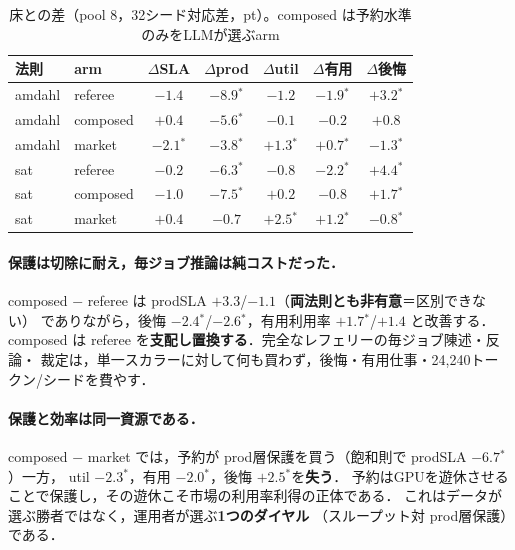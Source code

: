 \documentclass[uplatex,twocolumn,fontsize=9pt,paper=a4]{jlreq}
\newcommand{\sig}{$^{*}$}
\begin{document}
\begin{table}[t]
\centering\small
\caption{床との差（pool 8，32シード対応差，pt）。composed は予約水準のみをLLMが選ぶarm}
\label{tab:composed}
\begin{tabular}{llccccc}
\toprule
法則 & arm & $\Delta$SLA & $\Delta$prod & $\Delta$util & $\Delta$有用 & $\Delta$後悔 \\
\midrule
amdahl & referee  & $-1.4$ & $\mathbf{-8.9}$\sig & $-1.2$ & $-1.9$\sig & $+3.2$\sig \\
amdahl & composed & $+0.4$ & $\mathbf{-5.6}$\sig & $-0.1$ & $-0.2$ & $+0.8$ \\
amdahl & market   & $-2.1$\sig & $-3.8$\sig & $+1.3$\sig & $+0.7$\sig & $-1.3$\sig \\
sat    & referee  & $-0.2$ & $\mathbf{-6.3}$\sig & $-0.8$ & $-2.2$\sig & $+4.4$\sig \\
sat    & composed & $-1.0$ & $\mathbf{-7.5}$\sig & $+0.2$ & $-0.8$ & $+1.7$\sig \\
sat    & market   & $+0.4$ & $-0.7$ & $+2.5$\sig & $+1.2$\sig & $-0.8$\sig \\
\bottomrule
\end{tabular}
\end{table}

\paragraph{保護は切除に耐え，毎ジョブ推論は純コストだった．}
composed $-$ referee は prodSLA $+3.3$/$-1.1$（\textbf{両法則とも非有意}＝区別できない）
でありながら，後悔 $-2.4$\sig/$-2.6$\sig，有用利用率 $+1.7$\sig/$+1.4$ と改善する．
composed は referee を\textbf{支配し置換する}．完全なレフェリーの毎ジョブ陳述・反論・
裁定は，単一スカラーに対して何も買わず，後悔・有用仕事・24{,}240トークン/シードを費やす．

\paragraph{保護と効率は同一資源である．}
composed $-$ market では，予約が prod層保護を買う（飽和則で prodSLA $-6.7$\sig）一方，
util $-2.3$\sig，有用 $-2.0$\sig，後悔 $+2.5$\sig を\textbf{失う}．
予約はGPUを遊休させることで保護し，その遊休こそ市場の利用率利得の正体である．
これはデータが選ぶ勝者ではなく，運用者が選ぶ\textbf{1つのダイヤル}
（スループット対 prod層保護）である．
\end{document}
